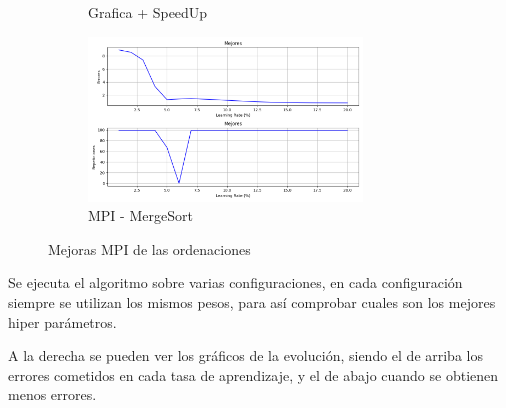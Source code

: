 			\begin{figure}[!h]
				\centering
				
				
				\begin{subfigure}[t]{0.35\textwidth}
					\label{fig:redneubusqueda}
					\caption{Grafica + SpeedUp}
				\end{subfigure}
				\hfill
				\begin{subfigure}[t]{0.55\textwidth}
					\centering
					\includegraphics[width=0.8\textwidth,height=0.8\textwidth]{images/chapter_4/redneu_err}
					
					\caption{MPI - MergeSort}
					\label{fig:Errores}
				\end{subfigure}
				
				\caption{Mejoras MPI de las ordenaciones}
				\label{fig:Red Neuronal - Busqueda}
			\end{figure}




			Se ejecuta el algoritmo sobre varias configuraciones, en cada configuración siempre se utilizan los mismos pesos, para así comprobar cuales son los mejores hiper parámetros.
			
			A la derecha se pueden ver los gráficos de la evolución, siendo el de arriba los errores cometidos en cada tasa de aprendizaje, y el de abajo cuando se obtienen menos errores.